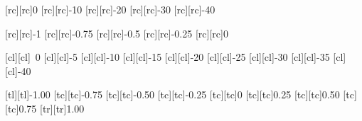 [rc][rc]{\scriptsize 0}
[rc][rc]{\scriptsize -10}
[rc][rc]{\scriptsize -20}
[rc][rc]{\scriptsize -30}
[rc][rc]{\scriptsize -40}

[rc][rc]{\scriptsize -1}
[rc][rc]{\scriptsize -0.75}
[rc][rc]{\scriptsize -0.5}
[rc][rc]{\scriptsize -0.25}
[rc][rc]{\scriptsize 0}

[cl][cl]{\scriptsize ~0}
[cl][cl]{\scriptsize -5}
[cl][cl]{\scriptsize -10}
[cl][cl]{\scriptsize -15}
[cl][cl]{\scriptsize -20}
[cl][cl]{\scriptsize -25}
[cl][cl]{\scriptsize -30}
[cl][cl]{\scriptsize -35}
[cl][cl]{\scriptsize -40}

[tl][tl]{\scriptsize -1.00}
[tc][tc]{\scriptsize -0.75}
[tc][tc]{\scriptsize -0.50}
[tc][tc]{\scriptsize -0.25}
[tc][tc]{\scriptsize 0}
[tc][tc]{\scriptsize 0.25}
[tc][tc]{\scriptsize 0.50}
[tc][tc]{\scriptsize 0.75}
[tr][tr]{\scriptsize 1.00}


